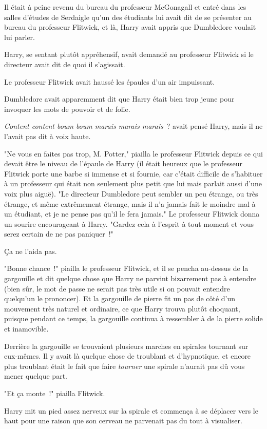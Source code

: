 Il était à peine revenu du bureau du professeur McGonagall et entré dans les salles d'études de Serdaigle qu'un des étudiants lui avait dit de se présenter au bureau du professeur Flitwick, et là, Harry avait appris que Dumbledore voulait lui parler.

Harry, se sentant plutôt appréhensif, avait demandé au professeur Flitwick si le directeur avait dit de quoi il s'agissait.

Le professeur Flitwick avait haussé les épaules d'un air impuissant.

Dumbledore avait apparemment dit que Harry était bien trop jeune pour invoquer les mots de pouvoir et de folie.

\emph{Content content boum boum marais marais marais}~? avait pensé Harry, mais il ne l'avait pas dit à voix haute.

"Ne vous en faites pas trop, M. Potter," piailla le professeur Flitwick depuis ce qui devait être le niveau de l'épaule de Harry (il était heureux que le professeur Flitwick porte une barbe si immense et si fournie, car c'était difficile de s'habituer à un professeur qui était non seulement plus petit que lui mais parlait aussi d'une voix plus aiguë). "Le directeur Dumbledore peut sembler un peu étrange, ou très étrange, et même extrêmement étrange, mais il n'a jamais fait le moindre mal à un étudiant, et je ne pense pas qu'il le fera jamais." Le professeur Flitwick donna un sourire encourageant à Harry. "Gardez cela à l'esprit à tout moment et vous serez certain de ne pas paniquer~!"

Ça ne l'aida pas.

"Bonne chance~!" piailla le professeur Flitwick, et il se pencha au-dessus de la gargouille et dit quelque chose que Harry ne parvint bizarrement pas à entendre (bien sûr, le mot de passe ne serait pas très utile si on pouvait entendre quelqu'un le prononcer). Et la gargouille de pierre fit un pas de côté d'un mouvement très naturel et ordinaire, ce que Harry trouva plutôt choquant, puisque pendant ce temps, la gargouille continua à ressembler à de la pierre solide et inamovible.

Derrière la gargouille se trouvaient plusieurs marches en spirales tournant sur eux-mêmes. Il y avait là quelque chose de troublant et d'hypnotique, et encore plus troublant était le fait que faire \emph{tourner} une spirale n'aurait pas dû vous mener quelque part.

"Et ça monte~!" piailla Flitwick.

Harry mit un pied assez nerveux sur la spirale et commença à se déplacer vers le haut pour une raison que son cerveau ne parvenait pas du tout à visualiser.

